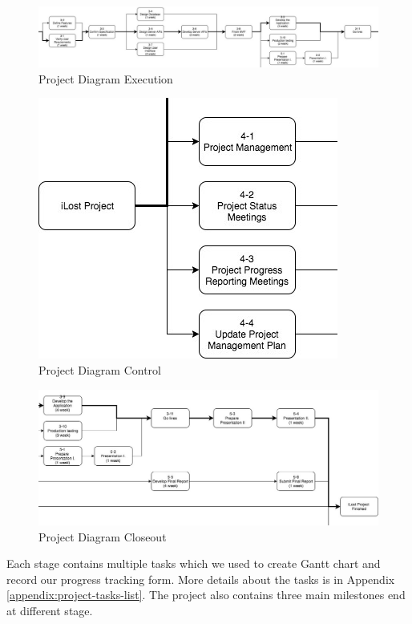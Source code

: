 \documentclass[12pt,a4paper]{article}
\begin{document}
        \begin{figure}[H]
          \centering
          \includegraphics[width=1\textwidth]{../assets/9-project-diagram-3.jpg}
          \caption{Project Diagram Execution}
          \label{fig:Project Diagram Execution}
        \end{figure}

        \begin{figure}[H]
          \centering
          \includegraphics[width=.5\textwidth]{../assets/9-project-diagram-4.jpg}
          \caption{Project Diagram Control}
          \label{fig:Project Diagram Control}
        \end{figure}

        \begin{figure}[H]
          \centering
          \includegraphics[width=1\textwidth]{../assets/9-project-diagram-5.jpg}
          \caption{Project Diagram Closeout}
          \label{fig:Project Diagram Closeout}
        \end{figure}

        Each stage contains multiple tasks which we used to create Gantt chart and record our progress tracking form. More details about the tasks is in Appendix \ref{appendix:project-tasks-list}. The project also contains three main milestones end at different stage.  
\end{document}
